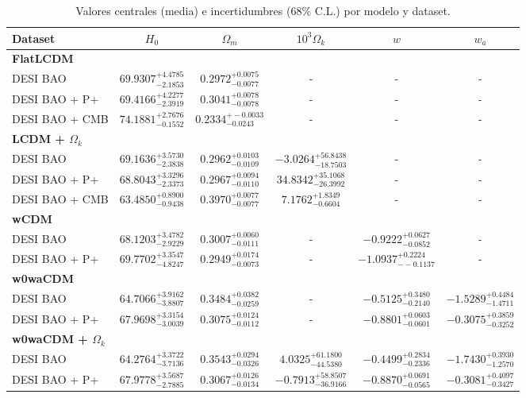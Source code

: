 \begin{table}[H]
    \centering
    \caption{Valores centrales (media) e incertidumbres (68\% C.L.) por modelo y dataset.}
    \label{tab:resumen}
    \begin{tabular}{lccccc}
        \toprule
        Dataset & $H_0$ & $\Omega_m$ & $10^3\Omega_k$ & $w$ & $w_a$ \\
        \midrule
        \multicolumn{6}{l}{\textbf{FlatLCDM}} \\
        \midrule
        DESI BAO & $69.9307^{+4.4785}_{-2.1853}$ & $0.2972^{+0.0075}_{-0.0077}$ & - & - & - \\
        DESI BAO + P+ & $69.4166^{+4.2277}_{-2.3919}$ & $0.3041^{+0.0078}_{-0.0078}$ & - & - & - \\
        DESI BAO + CMB & $74.1881^{+2.7676}_{-0.1552}$ & $0.2334^{+-0.0033}_{-0.0243}$ & - & - & - \\
        \midrule
        \multicolumn{6}{l}{\textbf{LCDM + $\Omega_k$}} \\
        \midrule
        DESI BAO & $69.1636^{+3.5730}_{-2.3838}$ & $0.2962^{+0.0103}_{-0.0109}$ & $-3.0264^{+56.8438}_{-18.7503}$ & - & - \\
        DESI BAO + P+ & $68.8043^{+3.3296}_{-2.3373}$ & $0.2967^{+0.0094}_{-0.0110}$ & $34.8342^{+35.1068}_{-26.3992}$ & - & - \\
        DESI BAO + CMB & $63.4850^{+0.8900}_{-0.9438}$ & $0.3970^{+0.0077}_{-0.0077}$ & $7.1762^{+1.8349}_{-0.6604}$ & - & - \\
        \midrule
        \multicolumn{6}{l}{\textbf{wCDM}} \\
        \midrule
        DESI BAO & $68.1203^{+3.4782}_{-2.9229}$ & $0.3007^{+0.0060}_{-0.0111}$ & - & $-0.9222^{+0.0627}_{-0.0852}$ & - \\
        DESI BAO + P+ & $69.7702^{+3.3547}_{-4.8247}$ & $0.2949^{+0.0174}_{-0.0073}$ & - & $-1.0937^{+0.2224}_{--0.1137}$ & - \\
        \midrule
        \multicolumn{6}{l}{\textbf{w0waCDM}} \\
        \midrule
        DESI BAO & $64.7066^{+3.9162}_{-3.8807}$ & $0.3484^{+0.0382}_{-0.0259}$ & - & $-0.5125^{+0.3480}_{-0.2140}$ & $-1.5289^{+0.4484}_{-1.4711}$ \\
        DESI BAO + P+ & $67.9698^{+3.3154}_{-3.0039}$ & $0.3075^{+0.0124}_{-0.0112}$ & - & $-0.8801^{+0.0603}_{-0.0601}$ & $-0.3075^{+0.3859}_{-0.3252}$ \\
        \midrule
        \multicolumn{6}{l}{\textbf{w0waCDM + $\Omega_k$}} \\
        \midrule
        DESI BAO & $64.2764^{+3.3722}_{-3.7136}$ & $0.3543^{+0.0294}_{-0.0326}$ & $4.0325^{+61.1800}_{-44.5380}$ & $-0.4499^{+0.2834}_{-0.2336}$ & $-1.7430^{+0.3930}_{-1.2570}$ \\
        DESI BAO + P+ & $67.9778^{+3.5687}_{-2.7885}$ & $0.3067^{+0.0126}_{-0.0134}$ & $-0.7913^{+58.8507}_{-36.9166}$ & $-0.8870^{+0.0691}_{-0.0565}$ & $-0.3081^{+0.4097}_{-0.3427}$ \\
        \bottomrule
    \end{tabular}
\end{table}